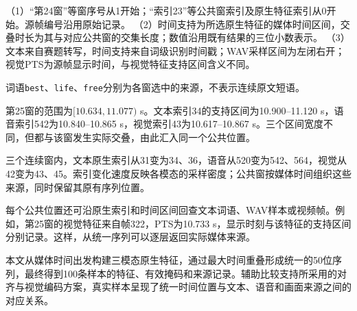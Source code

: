 \begin{table}[!htbp]
\par\vspace{0.35em}\begin{minipage}{\textwidth}\setlength{\parindent}{0pt}
（1）“第24窗”等窗序号从1开始；“索引23”等公共窗索引及原生特征索引从0开始。源帧编号沿用原始记录。
（2）时间支持为所选原生特征的媒体时间区间，交叠时长为其与对应公共窗的交集长度；数值沿用既有结果的三位小数表示。
（3）文本来自赛题转写，时间支持来自词级识别时间戳；WAV采样区间为左闭右开；视觉PTS为源帧显示时间，与视觉特征支持区间含义不同。\par
\noindent 词语\texttt{best}、\texttt{life}、\texttt{free}分别为各窗选中的来源，不表示连续原文短语。

\end{minipage}

\endgroup
\par\vspace{10bp}\begin{minipage}{\textwidth}\songti\normalsize\setlength{\parindent}{2em}
\QOneParagraph 第25窗的范围为$[10.634,11.077)$ s。文本索引34的支持区间为10.900--11.120 s，语音索引542为10.840--10.865 s，视觉索引43为10.617--10.867 s。三个区间宽度不同，但都与该窗发生实际交叠，由此汇入同一个公共位置。

\QOneParagraph 三个连续窗内，文本原生索引从31变为34、36，语音从520变为542、564，视觉从42变为43、45。索引变化速度反映各模态的采样密度；公共窗按媒体时间组织这些来源，同时保留其原有序列位置。

\QOneParagraph 每个公共位置还可沿原生索引和时间区间回查文本词语、WAV样本或视频帧。例如，第25窗的视觉特征来自帧322，PTS为10.733 s，显示时刻与该特征的支持区间分别记录。这样，从统一序列可以逐层返回实际媒体来源。

\QOneParagraph 本文从媒体时间出发构建三模态原生特征，通过最大时间重叠形成统一的50位序列，最终得到100条样本的特征、有效掩码和来源记录。辅助比较支持所采用的对齐与视觉编码方案，真实样本呈现了统一时间位置与文本、语音和画面来源之间的对应关系。

\end{minipage}
\end{table}
